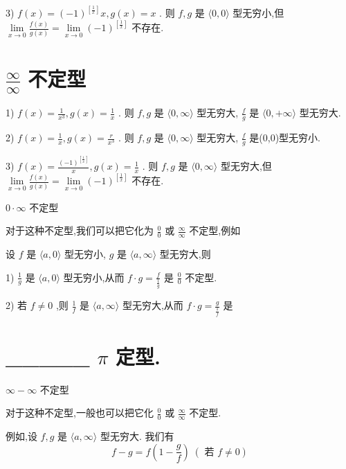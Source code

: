 3) $f\left( x\right)  = {\left( -1\right) }^{\left\lbrack  \frac{1}{x}\right\rbrack  }x,g\left( x\right)  = x$ . 则 $f,g$ 是 $\langle 0,0\rangle$ 型无穷小,但 $\mathop{\lim }\limits_{{x \rightarrow  0}}\frac{f\left( x\right) }{g\left( x\right) } = \mathop{\lim }\limits_{{x \rightarrow  0}}{\left( -1\right) }^{\left\lbrack  \frac{1}{x}\right\rbrack  }$ 不存在.

\section*{$\frac{\infty }{\infty }$ 不定型}

1) $f\left( x\right)  = \frac{1}{{x}^{3}},g\left( x\right)  = \frac{1}{x}$ . 则 $f,g$ 是 $\langle 0,\infty \rangle$ 型无穷大, $\frac{f}{g}$ 是 $\langle 0, + \infty \rangle$ 型无穷大.

2) $f\left( x\right)  = \frac{1}{x},g\left( x\right)  = \frac{r}{{x}^{3}}$ . 则 $f,g$ 是 $\langle 0,\infty \rangle$ 型无穷大, $\frac{f}{g}$ 是(0,0)型无穷小.

3) $f\left( x\right)  = \frac{{\left( -1\right) }^{\left\lbrack  \frac{1}{x}\right\rbrack  }}{x},g\left( x\right)  = \frac{1}{x}$ . 则 $f,g$ 是 $\langle 0,\infty \rangle$ 型无穷大,但 $\mathop{\lim }\limits_{{x \rightarrow  0}}\frac{f\left( x\right) }{g\left( x\right) } = \mathop{\lim }\limits_{{x \rightarrow  0}}{\left( -1\right) }^{\left\lbrack  \frac{1}{x}\right\rbrack  }$ 不存在.

$0 \cdot  \infty$ 不定型

对于这种不定型,我们可以把它化为 $\frac{0}{0}$ 或 $\frac{\infty }{\infty }$ 不定型,例如

设 $f$ 是 $\langle a,0\rangle$ 型无穷小, $g$ 是 $\langle a,\infty \rangle$ 型无穷大,则

1) $\frac{1}{g}$ 是 $\langle a,0\rangle$ 型无穷小,从而 $f \cdot  g = \frac{f}{\frac{1}{g}}$ 是 $\frac{0}{0}$ 不定型.

2) 若 $f \neq  0$ ,则 $\frac{1}{f}$ 是 $\langle a,\infty \rangle$ 型无穷大,从而 $f \cdot  g = \frac{g}{\frac{1}{f}}$ 是

\section*{\_\_\_\_\_ $\pi$ 定型.}

$\infty  - \infty$ 不定型

对于这种不定型,一般也可以把它化 $\frac{0}{0}$ 或 $\frac{\infty }{\infty }$ 不定型.

例如,设 $f,g$ 是 $\langle a,\infty \rangle$ 型无穷大. 我们有
$$f - g = f\left( {1 - \frac{g}{f}}\right) \;\left( {\text{ 若 }f \neq  0}\right)$$


